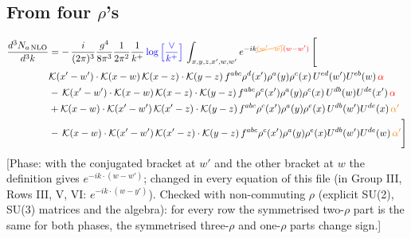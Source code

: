 \documentclass[9pt]{article}
\numberwithin{equation}{section}
\begin{document}
\subsection{From four $\rho$'s}
\begin{align}
    \frac{d^{3}N_{a\,\rm NLO}}{d^{3}k} & = -\,\frac{i}{(2\pi)^{3}}\frac{g^{4}}{8\pi^{3}}\frac{1}{2\pi^{2}} \frac{1}{k^{+}}\,{\color{blue}\log{\left[\frac{\vee}{k^{+}}\right]}}\,\int_{x,y,z,x^{\prime},w,w^{\prime}}e^{-ik{\color{orange}\cancel{(w^{\prime}-w)}}{\color{red}(w-w^{\prime})}}\, \Bigg[\notag \\ &  \mathcal{K}(x'-w')\cdot \mathcal{K}(x-w)\, \mathcal{K}(x-z)\cdot \mathcal{K}(y-z)\, f^{a b c} \rho^{d}(x') \rho^{a}(y) \rho^{c}(x)\,U^{ed}(w') U^{e b}(w)\,  {\color{red}\alpha} \nonumber\\
    &  -\,\mathcal{K}(x'-w')\cdot \mathcal{K}(x-w)\, \mathcal{K}(x-z)\cdot \mathcal{K}(y-z)\, f^{a b c} \rho^{e}(x') \rho^{a}(y) \rho^{c}(x)\, U^{d b}(w) U^{de}(x')\, {\color{red}\alpha} \nonumber\\
    & + \mathcal{K}(x-w)\cdot \mathcal{K}(x'-w')\, \mathcal{K}(x'-z)\cdot \mathcal{K}(y-z)\, f^{a b c} \rho^{c}(x') \rho^{a}(y) \rho^{e}(x)\,U^{d b}(w') U^{de}(x)\, {\color{orange} \alpha'} \nonumber\\
    & -\,\mathcal{K}(x-w)\cdot \mathcal{K}(x'-w')\, \mathcal{K}(x'-z)\cdot \mathcal{K}(y-z)\, f^{a b c} \rho^{c}(x') \rho^{a}(y) \rho^{e}(x) U^{db}(w') U^{de}(w)\, {\color{orange} \alpha'}\Bigg]
\end{align} {\color{red}[Phase: with the conjugated bracket at $w'$ and the other bracket at $w$ the definition gives $e^{-ik\cdot(w-w')}$; changed in every equation of this file (in Group III, Rows III, V, VI: $e^{-ik\cdot(w-y')}$). Checked with non-commuting $\rho$ (explicit SU(2), SU(3) matrices and the algebra): for every row the symmetrised two-$\rho$ part is the same for both phases, the symmetrised three-$\rho$ and one-$\rho$ parts change sign.]}\par\noindent 
\end{document}
